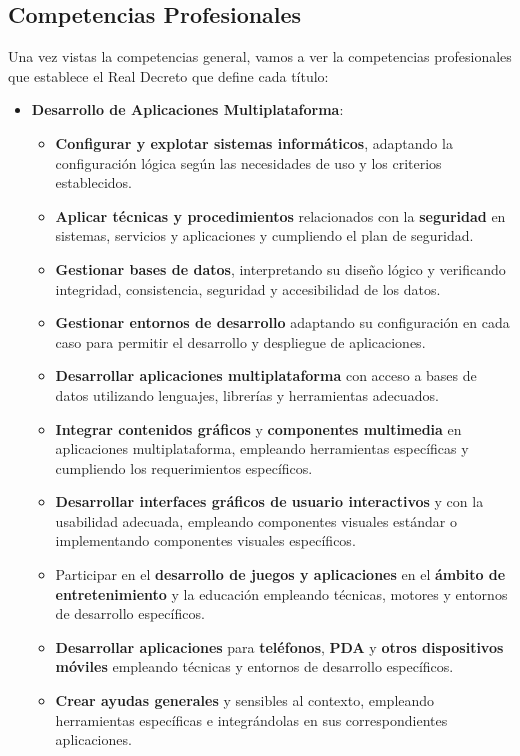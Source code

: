 \subsection{Competencias Profesionales}
Una vez vistas la competencias general, vamos a ver la competencias profesionales que establece el Real Decreto que define cada título:

\begin{itemize}
    \item \textbf{Desarrollo de Aplicaciones Multiplataforma}:
    \begin{itemize}
        \item \textbf{Configurar y explotar sistemas informáticos}, adaptando la configuración lógica según las necesidades de uso y los criterios establecidos.
        \item \textbf{Aplicar técnicas y procedimientos} relacionados con la \textbf{seguridad} en sistemas, servicios y aplicaciones y cumpliendo el plan de seguridad.
        \item \textbf{Gestionar bases de datos}, interpretando su diseño lógico y verificando integridad, consistencia, seguridad y accesibilidad de los datos.
        \item \textbf{Gestionar entornos de desarrollo} adaptando su configuración en cada caso para permitir el desarrollo y despliegue de aplicaciones.
        \item \textbf{Desarrollar aplicaciones multiplataforma} con acceso a bases de datos utilizando lenguajes, librerías y herramientas adecuados.
        \item \textbf{Integrar contenidos gráficos} y \textbf{componentes multimedia} en aplicaciones multiplataforma, empleando herramientas específicas y cumpliendo los requerimientos específicos.
        \item \textbf{Desarrollar interfaces gráficos de usuario interactivos }y con la usabilidad adecuada, empleando componentes visuales estándar o implementando componentes visuales específicos.
        \item Participar en el \textbf{desarrollo de juegos y aplicaciones} en el \textbf{ámbito de entretenimiento} y la educación empleando técnicas, motores y entornos de desarrollo específicos.
        \item \textbf{Desarrollar aplicaciones} para \textbf{teléfonos},\textbf{ PDA} y \textbf{otros dispositivos móviles} empleando técnicas y entornos de desarrollo específicos.
        \item \textbf{Crear ayudas generales} y sensibles al contexto, empleando herramientas específicas e integrándolas en sus correspondientes aplicaciones.

\end{itemize}
\end{itemize}
